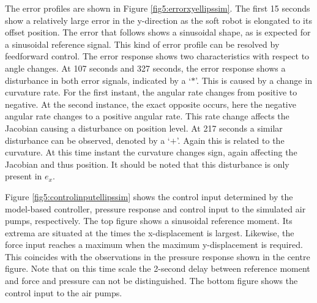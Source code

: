 The error profiles are shown in Figure \ref{fig5:errorxyellipssim}. The first 15 seconds show a relatively large error in the y-direction as the soft robot is elongated to its offset position. The error that follows shows a sinusoidal shape, as is expected for a sinusoidal reference signal. This kind of error profile can be resolved by feedforward control. The error response shows two characteristics with respect to angle changes. At 107 seconds and 327 seconds, the error response shows a disturbance in both error signals, indicated by a `$*$'. This is caused by a change in curvature rate. For the first instant, the angular rate changes from positive to negative. At the second instance, the exact opposite occurs, here the negative angular rate changes to a positive angular rate. This rate change affects the Jacobian causing a disturbance on position level. At 217 seconds a similar disturbance can be observed, denoted by a `$+$'. Again this is related to the curvature. At this time instant the curvature changes sign, again affecting the Jacobian and thus position. It should be noted that this disturbance is only present in $e_x$.




Figure \ref{fig5:controlinputellipssim} shows the control input determined by the model-based controller, pressure response and control input to the simulated air pumps, respectively. The top figure shows a sinusoidal reference moment. Its extrema are situated at the times the x-displacement is largest. Likewise, the force input reaches a maximum when the maximum y-displacement is required. This coincides with the observations in the pressure response shown in the centre figure. Note that on this time scale the 2-second delay between reference moment and force and pressure can not be distinguished. The bottom figure shows the control input to the air pumps.



